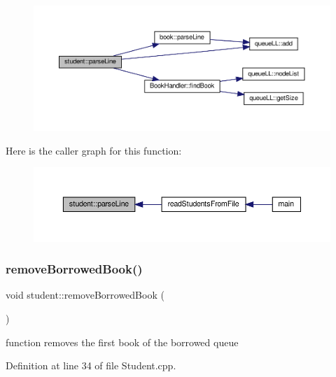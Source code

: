 \nopagebreak
\begin{figure}[H]
\begin{center}
\leavevmode
\includegraphics[width=350pt]{classstudent_a73c407020ea392b45dc9ff9babc0850b_cgraph}
\end{center}
\end{figure}
Here is the caller graph for this function\+:
\nopagebreak
\begin{figure}[H]
\begin{center}
\leavevmode
\includegraphics[width=350pt]{classstudent_a73c407020ea392b45dc9ff9babc0850b_icgraph}
\end{center}
\end{figure}
\mbox{\label{classstudent_ab98c4cb9d85152c3abd2b5d4255b8271}} 
\subsubsection{\texorpdfstring{remove\+Borrowed\+Book()}{removeBorrowedBook()}}
{\footnotesize\ttfamily void student\+::remove\+Borrowed\+Book (\begin{DoxyParamCaption}{ }\end{DoxyParamCaption})}

function removes the first book of the borrowed queue 

Definition at line 34 of file Student.\+cpp.


